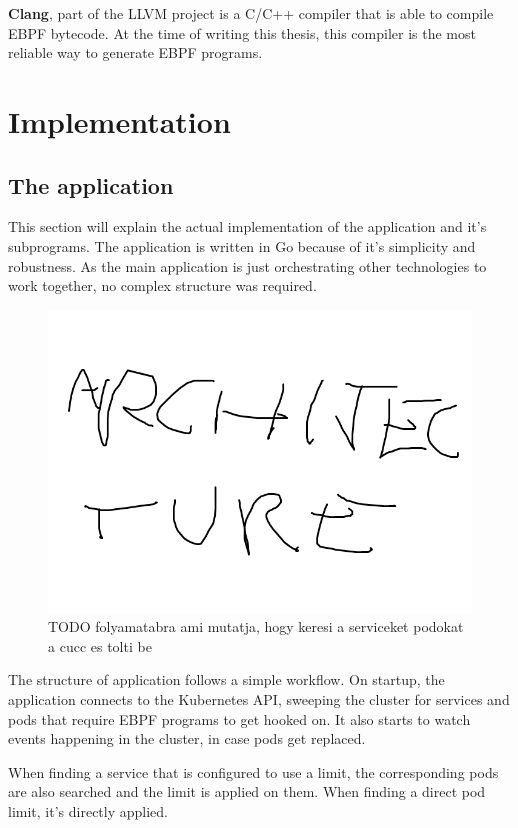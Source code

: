 \textbf{Clang}\cite{clang}, part of the LLVM project is a C/C++ compiler that is able to compile EBPF bytecode. At the time of writing this thesis, this compiler is the most reliable way to generate EBPF programs.

\newpage
\section{Implementation}
\subsection{The application}
This section will explain the actual implementation of the application and it's subprograms. The application is written in Go because of it's simplicity and robustness. As the main application is just orchestrating other technologies to work together, no complex structure was required.

\begin{figure}[H]
	\centering
	\includegraphics[width=\textwidth]{images/archi.png}
	\caption{TODO folyamatabra ami mutatja, hogy keresi a serviceket podokat a cucc es tolti be}
	\label{fig:loading-arch}
\end{figure}

The structure of application follows a simple workflow. On startup, the application connects to the Kubernetes API, sweeping the cluster for services and pods that require EBPF programs to get hooked on. It also starts to watch events happening in the cluster, in case pods get replaced.

When finding a service that is configured to use a limit, the corresponding pods are also searched and the limit is applied on them. When finding a direct pod limit, it's directly applied.

